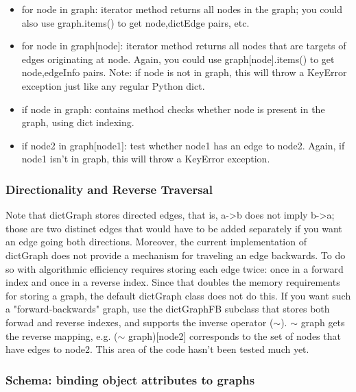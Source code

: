 \documentclass{howto}
\begin{document}
\begin{itemize}

\item
for node in graph: iterator method returns all nodes in the graph; you could also use graph.items() to get node,dictEdge pairs, etc.

\item
for node in graph[node]:  iterator method returns all nodes that are targets of edges originating at node.  Again, you could use graph[node].items() to get node,edgeInfo pairs.  Note: if node is not in graph, this will throw a KeyError exception just like any regular Python dict.

\item
if node in graph:  contains method checks whether node is present in the graph, using dict indexing.

\item
if node2 in graph[node1]:  test whether node1 has an edge to node2.  Again, if node1 isn't in graph, this will throw a KeyError exception.

\end{itemize}

\subsubsection{Directionality and Reverse Traversal}

Note that dictGraph stores directed edges, that is, a->b does not imply b->a; those are two distinct edges that would have to be added separately if you want an edge going both directions.  Moreover, the current implementation of dictGraph does not provide a mechanism for traveling an edge backwards.  To do so with algorithmic efficiency requires storing each edge twice: once in a forward index and once in a reverse index.  Since that doubles the memory requirements for storing a graph, the default dictGraph class does not do this.  If you want such a "forward-backwards" graph, use the dictGraphFB subclass that stores both forwad and reverse indexes, and supports the inverse operator ($\sim$).  $\sim$ graph gets the reverse mapping, e.g. ($\sim$ graph)[node2] corresponds to the set of nodes that have edges to node2.  This area of the code hasn't been tested much yet.

\subsubsection{Schema: binding object attributes to graphs}
\end{document}
